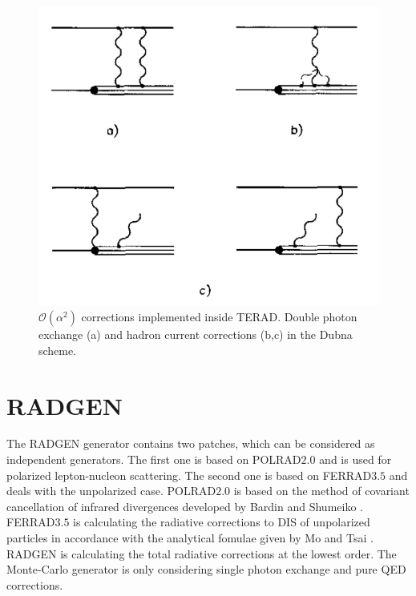\begin{figure}[!h]
  \centering
	\includegraphics[scale=0.8]{./gfx/order2corr.png}
	\caption{$\mathscr{O}(\alpha^2)$ corrections implemented inside TERAD. Double photon exchange (a) and hadron current corrections (b,c) in the Dubna scheme.}
	\label{pic:order2corr}
\end{figure}


\section{RADGEN}

The RADGEN generator \cite{RADGEN} contains two patches, which can be considered as independent generators. The first one is based on POLRAD$2.0$ \cite{POLRAD} and is used for polarized lepton-nucleon scattering. The second one is based on FERRAD$3.5$ \cite{FERRAD} and deals with the unpolarized case.
POLRAD$2.0$ is based on the method of covariant cancellation of infrared divergences developed by Bardin and Shumeiko \cite{BardinShu}. FERRAD$3.5$ is calculating the radiative corrections to DIS of unpolarized particles in accordance with the analytical fomulae given by Mo and Tsai \cite{MoTsai}. RADGEN is calculating the total radiative corrections at the lowest order. The Monte-Carlo generator is only considering single photon exchange and pure QED corrections.


